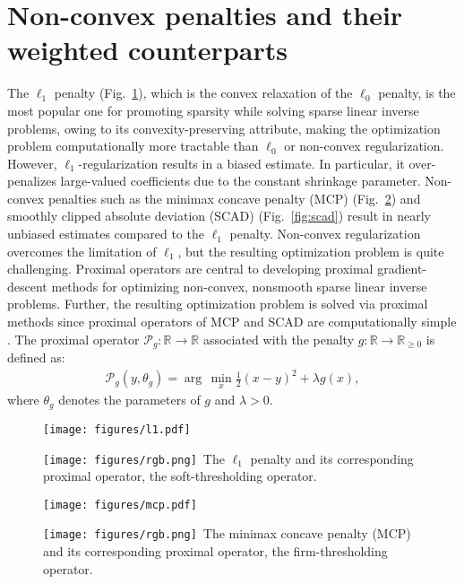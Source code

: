 \documentclass[journal]{IEEEtran}
\newcommand{\argminA}{\arg\,\min}
\newcommand{\rgbsymbol}{\texttt{[image: figures/rgb.png]}}
\begin{document}
\section{Non-convex penalties and their weighted counterparts}
\label{sec:penalties}
The $\ell_1$ penalty (Fig.~\ref{fig:l1}), which is the convex relaxation of the $\ell_0$ penalty, is the most popular one for promoting sparsity while solving sparse linear inverse problems, owing to its convexity-preserving attribute, making the optimization problem computationally more tractable than $\ell_0$ or non-convex regularization. However, $\ell_1$-regularization results in a biased estimate. In particular, it over-penalizes large-valued coefficients due to the constant shrinkage parameter. Non-convex penalties such as the minimax concave penalty (MCP) (Fig.~\ref{fig:mcp}) and smoothly clipped absolute deviation (SCAD) (Fig.~\ref{fig:scad}) result in nearly unbiased estimates compared to the $\ell_1$ penalty. Non-convex regularization overcomes the limitation of $\ell_1$, but the resulting optimization problem is quite challenging. Proximal operators are central to developing proximal gradient-descent methods for optimizing non-convex, nonsmooth sparse linear inverse problems. Further, the resulting optimization problem is solved via proximal methods since proximal operators of MCP and SCAD are computationally simple \cite{zhang2010analysis, fan2001variable}. The proximal operator $\mathcal{P}_g:\mathbb{R} \to \mathbb{R}$ associated with the penalty $g: \mathbb{R} \to \mathbb{R}_{\geq 0}$ is defined as:
\begin{align}
    \mathcal{P}_g(y,\theta_g)=\argminA_{x}\frac{1}{2}(x-y)^{2}+\lambda g(x),
\end{align}
where $\theta_g$ denotes the parameters of $g$ and $\lambda > 0$.

\begin{figure}[t]
    \centering
    \texttt{[image: figures/l1.pdf]}
    \caption{\protect\rgbsymbol~The $\ell_1$ penalty and its corresponding proximal operator, the soft-thresholding operator.} \label{fig:l1}
\end{figure}%

\begin{figure}[t]
    \centering
    \texttt{[image: figures/mcp.pdf]}
    \caption{\protect\rgbsymbol~The minimax concave penalty (MCP) and its corresponding proximal operator, the firm-thresholding operator.} \label{fig:mcp}
\end{figure}%
\end{document}
